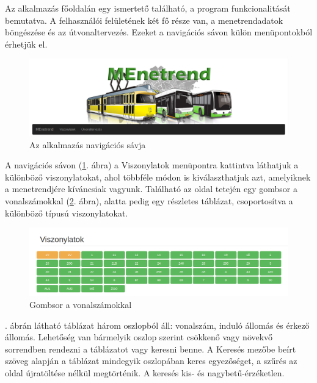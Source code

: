 



Az alkalmazás főoldalán egy ismertető található, a program funkcionalitását bemutatva.
A felhasználói felületének két fő része van, a menetrendadatok böngészése és az útvonaltervezés. Ezeket a navigációs sávon külön menüpontokból érhetjük el.

\begin{figure}[h!]
\centering
\includegraphics[scale=0.32]{kepek/navbar.png}
\caption{Az alkalmazás navigációs sávja}
\label{fig:navbar}
\end{figure}

A navigációs sávon (\ref{fig:navbar}. ábra) a Viszonylatok menüpontra kattintva láthatjuk a különböző viszonylatokat, ahol többféle módon is kiválaszthatjuk azt, amelyiknek a menetrendjére kíváncsiak vagyunk. Található az oldal tetején egy gombsor a vonalszámokkal (\ref{fig:viszonylatok_gombsor}. ábra), alatta pedig egy részletes táblázat, csoportosítva a különböző típusú viszonylatokat.

\begin{figure}[h!]
\centering
\includegraphics[scale=0.32]{kepek/viszonylatok_gombsor.png}
\caption{Gombsor a vonalszámokkal}
\label{fig:viszonylatok_gombsor}
\end{figure}

. ábrán látható táblázat három oszlopból áll: vonalszám, induló állomás és érkező állomás. Lehetőség van bármelyik oszlop szerint csökkenő vagy növekvő sorrendben rendezni a táblázatot vagy keresni benne. A Keresés mezőbe beírt szöveg alapján a táblázat mindegyik oszlopában keres egyezőséget, a szűrés az oldal újratöltése nélkül megtörténik. A keresés kis- és nagybetű-érzéketlen.

